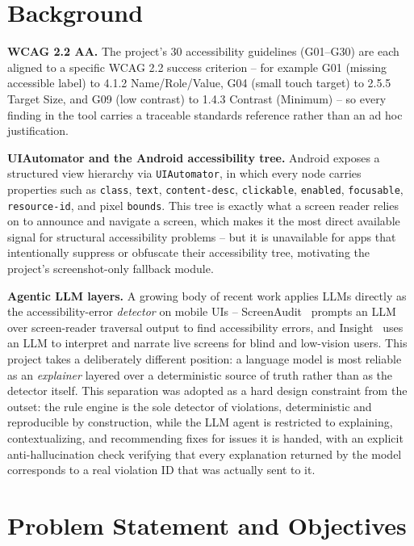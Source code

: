 \documentclass[10pt,conference]{IEEEtran}
\begin{document}
\section{Background}

\textbf{WCAG 2.2 AA.} The project's 30 accessibility guidelines (G01--G30) are each aligned to a specific WCAG 2.2 success criterion -- for example G01 (missing accessible label) to 4.1.2 Name/Role/Value, G04 (small touch target) to 2.5.5 Target Size, and G09 (low contrast) to 1.4.3 Contrast (Minimum) -- so every finding in the tool carries a traceable standards reference rather than an ad hoc justification.

\textbf{UIAutomator and the Android accessibility tree.} Android exposes a structured view hierarchy via \texttt{UIAutomator}, in which every node carries properties such as \texttt{class}, \texttt{text}, \texttt{content-desc}, \texttt{clickable}, \texttt{enabled}, \texttt{focusable}, \texttt{resource-id}, and pixel \texttt{bounds}. This tree is exactly what a screen reader relies on to announce and navigate a screen, which makes it the most direct available signal for structural accessibility problems -- but it is unavailable for apps that intentionally suppress or obfuscate their accessibility tree, motivating the project's screenshot-only fallback module.

\textbf{Agentic LLM layers.} A growing body of recent work applies LLMs directly as the accessibility-error \emph{detector} on mobile UIs -- ScreenAudit~\cite{screenaudit} prompts an LLM over screen-reader traversal output to find accessibility errors, and Insight~\cite{insight} uses an LLM to interpret and narrate live screens for blind and low-vision users. This project takes a deliberately different position: a language model is most reliable as an \emph{explainer} layered over a deterministic source of truth rather than as the detector itself. This separation was adopted as a hard design constraint from the outset: the rule engine is the sole detector of violations, deterministic and reproducible by construction, while the LLM agent is restricted to explaining, contextualizing, and recommending fixes for issues it is handed, with an explicit anti-hallucination check verifying that every explanation returned by the model corresponds to a real violation ID that was actually sent to it.

\section{Problem Statement and Objectives}
\end{document}
